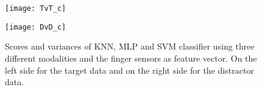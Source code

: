 \begin{figure}
	\centering
	\begin{minipage}{0.495\textwidth}
		\centering
		\texttt{[image: TvT\_c]}
	\end{minipage}
	\begin{minipage}{0.495\textwidth}
		\centering
		\texttt{[image: DvD\_c]}
	\end{minipage}
	\caption{Scores and variances of KNN, MLP and SVM classifier using three different modalities and the finger sensors as feature vector. On the left side for the target data and on the right side for the distractor data.}
	\label{classifier}
\end{figure}
